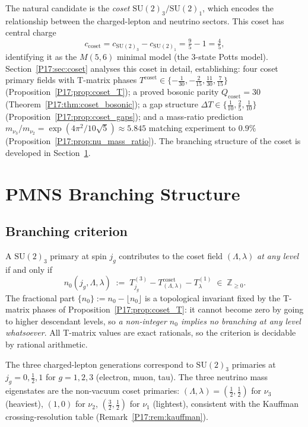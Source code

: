\documentclass[11pt,a4paper]{article}
\theoremstyle{definition}\newtheorem{definition}[theorem]{Definition}
\theoremstyle{remark}
\newcommand{\SU}{\mathrm{SU}}
\begin{document}
The natural candidate is the \emph{coset} $\SU(2)_3/\SU(2)_1$, which
encodes the relationship between the charged-lepton and neutrino
sectors. This coset has central charge
\[
  c_{\mathrm{coset}}=c_{\SU(2)_3}-c_{\SU(2)_1}=\tfrac{9}{5}-1=\tfrac{4}{5},
\]
identifying it as the $M(5,6)$ minimal model (the $3$-state Potts
model). Section~\ref{P17:sec:coset} analyses this coset in detail,
establishing: four coset primary fields with T-matrix phases
$T^{\mathrm{coset}}\in\{-\frac{1}{30},-\frac{2}{15},\frac{11}{30},\frac{7}{15}\}$
(Proposition~\ref{P17:prop:coset_T}); a proved bosonic parity
$Q_{\mathrm{coset}}=30$ (Theorem~\ref{P17:thm:coset_bosonic}); a gap
structure $\Delta T\in\{\frac{1}{10},\frac{2}{5},\frac{1}{10}\}$
(Proposition~\ref{P17:prop:coset_gaps}); and a mass-ratio prediction
$m_{\nu_3}/m_{\nu_2}=\exp(4\pi^2/10\sqrt{5})\approx5.845$ matching
experiment to $0.9\%$ (Proposition~\ref{P17:prop:nu_mass_ratio}).
The branching structure of the coset is developed in
Section~\ref{P17:sec:pmns_branching}.

\section{PMNS Branching Structure}
\label{P17:sec:pmns_branching}

\subsection{Branching criterion}

A $\SU(2)_3$ primary at spin $j_g$ contributes to the coset field
$(\Lambda,\lambda)$ \emph{at any level} if and only if
\begin{equation}
  n_0(j_g,\Lambda,\lambda)
  \;:=\; T^{(3)}_{j_g} - T^{\mathrm{coset}}_{(\Lambda,\lambda)}
             - T^{(1)}_\lambda
  \;\in\; \mathbb{Z}_{\geq 0}.
  \label{P17:eq:branching_condition}
\end{equation}
The fractional part $\{n_0\}:=n_0-\lfloor n_0\rfloor$
is a topological invariant fixed by the T-matrix phases of
Proposition~\ref{P17:prop:coset_T}: it cannot become zero by going to
higher descendant levels, so \emph{a non-integer $n_0$ implies no
branching at any level whatsoever}.  All T-matrix values are exact
rationals, so the criterion is decidable by rational arithmetic.

The three charged-lepton generations correspond to $\SU(2)_3$ primaries
at $j_g=0,\tfrac12,1$ for $g=1,2,3$ (electron, muon, tau).
The three neutrino mass eigenstates are the non-vacuum coset primaries:
$(\Lambda,\lambda)=(\tfrac12,\tfrac12)$ for $\nu_3$ (heaviest),
$(1,0)$ for $\nu_2$, $(\tfrac32,\tfrac12)$ for $\nu_1$ (lightest),
consistent with the Kauffman crossing-resolution table
(Remark~\ref{P17:rem:kauffman}).
\end{document}
